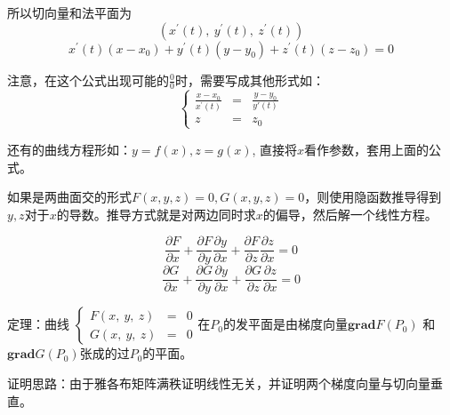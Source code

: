 \documentclass[10pt, a4paper]{article}
\begin{document}
                所以切向量和法平面为
                \begin{equation}
                    (x^{'}(t),\ y^{'}(t),\ z^{'}(t))
                \end{equation}
                \begin{equation}
                    x^{'}(t)(x - x_0) + y^{'}(t)(y - y_0) + z^{'}(t)(z - z_0) = 0 
                \end{equation}
                
                注意，在这个公式出现可能的$\frac{0}{0}$时，需要写成其他形式如：
                $$
                    \left\{
                        \begin{aligned}
                            \frac{x - x_0}{x^{'}(t)} & = & \frac{y - y_0}{y'(t)} \\
                            z&=&z_0
                        \end{aligned}
                        \right.
                $$
                
                还有的曲线方程形如：$y = f(x), z = g(x)$, 直接将$x$看作参数，套用上面的公式。
                
                如果是两曲面交的形式$F(x, y, z) = 0, G(x, y, z) = 0$，则使用隐函数推导得到$y, z$对于$x$的导数。推导方式就是对两边同时求$x$的偏导，然后解一个线性方程。
                
                $$
                    \frac{\partial F}{\partial x} + \frac{\partial F}{\partial y}\frac{\partial y}{\partial x} + \frac{\partial F}{\partial z}\frac{\partial z}{\partial x} = 0
                $$
                $$
                    \frac{\partial G}{\partial x} + \frac{\partial G}{\partial y}\frac{\partial y}{\partial x} + \frac{\partial G}{\partial z}\frac{\partial z}{\partial x} = 0
                $$ 
                
                定理：曲线
                $
                    \left\{
                        \begin{aligned}
                            F(x,\ y,\ z) & = & 0 \\
                            G(x,\ y,\ z) & = & 0
                        \end{aligned}
                    \right.
                $在$P_0$的发平面是由梯度向量$\textbf{grad}F(P_0)$ 和 $\textbf{grad}G(P_0)$张成的过$P_0$的平面。
                
                证明思路：由于雅各布矩阵满秩证明线性无关，并证明两个梯度向量与切向量垂直。

                
\end{document}
